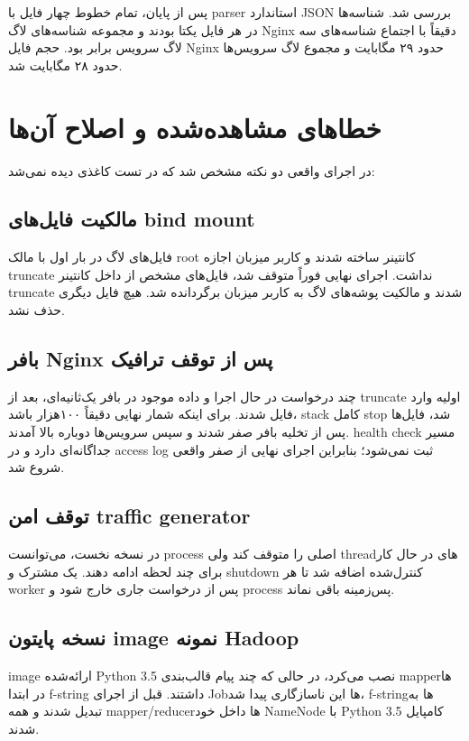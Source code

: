 \documentclass[12pt,a4paper]{article}
\begin{document}
پس از پایان، تمام خطوط چهار فایل با parser استاندارد JSON بررسی شد. شناسه‌ها در هر فایل یکتا بودند و مجموعه شناسه‌های لاگ Nginx دقیقاً با اجتماع شناسه‌های سه لاگ سرویس برابر بود. حجم فایل Nginx حدود ۲۹ مگابایت و مجموع لاگ سرویس‌ها حدود ۲۸ مگابایت شد.

\section{خطاهای مشاهده‌شده و اصلاح آن‌ها}

در اجرای واقعی دو نکته مشخص شد که در تست کاغذی دیده نمی‌شد:

\subsection{مالکیت فایل‌های bind mount}

فایل‌های لاگ در بار اول با مالک root کانتینر ساخته شدند و کاربر میزبان اجازه truncate نداشت. اجرای نهایی فوراً متوقف شد، فایل‌های مشخص از داخل کانتینر truncate شدند و مالکیت پوشه‌های لاگ به کاربر میزبان برگردانده شد. هیچ فایل دیگری حذف نشد.

\subsection{بافر Nginx پس از توقف ترافیک}

چند درخواست در حال اجرا و داده موجود در بافر یک‌ثانیه‌ای، بعد از truncate اولیه وارد فایل شدند. برای اینکه شمار نهایی دقیقاً ۱۰۰هزار باشد، stack کامل stop شد، فایل‌ها پس از تخلیه بافر صفر شدند و سپس سرویس‌ها دوباره بالا آمدند. health check مسیر جداگانه‌ای دارد و در access log ثبت نمی‌شود؛ بنابراین اجرای نهایی از صفر واقعی شروع شد.

\subsection{توقف امن traffic generator}

در نسخه نخست،  می‌توانست process اصلی را متوقف کند ولی threadهای در حال کار برای چند لحظه ادامه دهند. یک  مشترک و shutdown کنترل‌شده اضافه شد تا هر worker پس از درخواست جاری خارج شود و process پس‌زمینه باقی نماند.

\subsection{نسخه پایتون image نمونه Hadoop}

image ارائه‌شده Python 3.5 نصب می‌کرد، در حالی که چند پیام قالب‌بندی mapperها در ابتدا f-string داشتند. قبل از اجرای Jobها این ناسازگاری پیدا شد، f-stringها به  تبدیل شدند و همه mapper/reducerها داخل خود NameNode با Python 3.5 کامپایل شدند.
\end{document}
